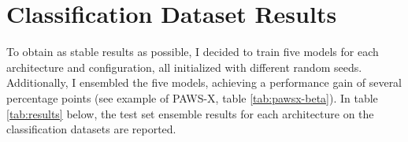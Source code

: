 







\section{Classification Dataset Results}
\label{sec:classification-results}

To obtain as stable results as possible, I decided to train five models for each architecture
and configuration, all initialized with different random seeds. Additionally, I ensembled the
five models, achieving a performance gain of several percentage points (see example of PAWS-X,
table \ref{tab:pawsx-beta}). In table \ref{tab:results} below, the test set ensemble results for
each architecture on the classification datasets are reported.

